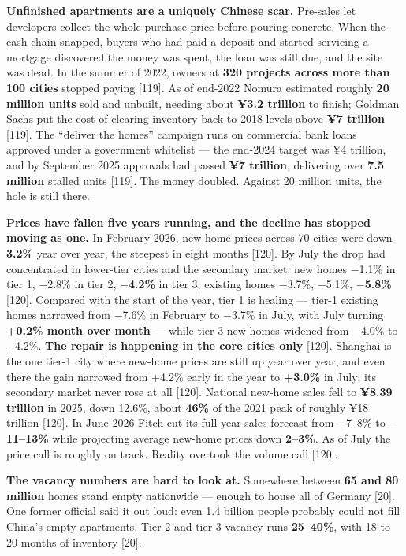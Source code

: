 \documentclass[11pt,a4paper]{article}
\begin{document}
\textbf{Unfinished apartments are a uniquely Chinese scar.} Pre-sales let developers collect the whole purchase price before pouring concrete. When the cash chain snapped, buyers who had paid a deposit and started servicing a mortgage discovered the money was spent, the loan was still due, and the site was dead. In the summer of 2022, owners at \textbf{320 projects across more than 100 cities} stopped paying [119]. As of end-2022 Nomura estimated roughly \textbf{20 million units} sold and unbuilt, needing about \textbf{¥3.2 trillion} to finish; Goldman Sachs put the cost of clearing inventory back to 2018 levels above \textbf{¥7 trillion}{} [119]. The ``deliver the homes'' campaign runs on commercial bank loans approved under a government whitelist --- the end-2024 target was ¥4 trillion, and by September 2025 approvals had passed \textbf{¥7 trillion}, delivering over \textbf{7.5 million} stalled units [119]. The money doubled. Against 20 million units, the hole is still there.

\textbf{Prices have fallen five years running, and the decline has stopped moving as one.} In February 2026, new-home prices across 70 cities were down \textbf{3.2\%} year over year, the steepest in eight months [120]. By July the drop had concentrated in lower-tier cities and the secondary market: new homes $-$1.1\% in tier 1, $-$2.8\% in tier 2, \textbf{$-$4.2\%} in tier 3; existing homes $-$3.7\%, $-$5.1\%, \textbf{$-$5.8\%}{} [120]. Compared with the start of the year, tier 1 is healing --- tier-1 existing homes narrowed from $-$7.6\% in February to $-$3.7\% in July, with July turning \textbf{+0.2\% month over month} --- while tier-3 new homes widened from $-$4.0\% to $-$4.2\%. \textbf{The repair is happening in the core cities only}{} [120]. Shanghai is the one tier-1 city where new-home prices are still up year over year, and even there the gain narrowed from +4.2\% early in the year to \textbf{+3.0\%} in July; its secondary market never rose at all [120]. National new-home sales fell to \textbf{¥8.39 trillion} in 2025, down 12.6\%, about \textbf{46\%} of the 2021 peak of roughly ¥18 trillion [120]. In June 2026 Fitch cut its full-year sales forecast from $-$7--8\% to \textbf{$-$11--13\%} while projecting average new-home prices down \textbf{2--3\%}. As of July the price call is roughly on track. Reality overtook the volume call [120].

\textbf{The vacancy numbers are hard to look at.} Somewhere between \textbf{65 and 80 million} homes stand empty nationwide --- enough to house all of Germany [20]. One former official said it out loud: even 1.4 billion people probably could not fill China's empty apartments. Tier-2 and tier-3 vacancy runs \textbf{25--40\%}, with 18 to 20 months of inventory [20].
\end{document}
